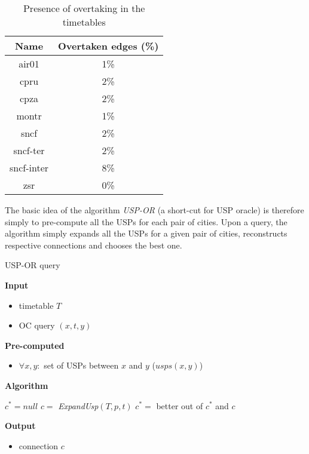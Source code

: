     \begin{table}[h!]
    	\centering
		\begin{tabular}{c|c}
            \rowcolor{tablehead}
        	\textbf{Name} & \textbf{Overtaken edges (\%)} \\
			\hline
			air01 & 1\% \\
			cpru & 2\% \\
			cpza & 2\% \\
			montr & 1\% \\
			sncf & 2\% \\
			sncf-ter & 2\% \\
			sncf-inter & 8\% \\
			zsr & 0\% \\
		\end{tabular}
		\caption{\label{tab:overtake} Presence of overtaking in the timetables}
	\end{table}
	
	\noindent The basic idea of the algorithm \textit{USP-OR} (a short-cut for USP oracle) is therefore simply to pre-compute all the USPs for each pair of cities. Upon a query, the algorithm simply expands all the USPs for a given pair of cities, reconstructs respective connections and chooses the best one. \\
	
	\color{algcolor}
	\begin{algorithm}[H]
		\color{inalgcolor}
		\caption{USP-OR query}
		\label{alg:uspor-query}
		\textbf{Input} 
		\begin{itemize}
			\item timetable $T$
			\item OC query $(x, t, y)$
		\end{itemize}
		\textbf{Pre-computed} 
		\begin{itemize}
			\item $\forall x, y:$ set of USPs between $x$ and $y$ ($usps(x, y)$)
		\end{itemize}
		\textbf{Algorithm}
		\begin{algorithmic}
			\STATE $c^{*} = null$
				\STATE $c =$ \textit{ExpandUsp}$(T, p, t)$
				\STATE $c^{*} =$ better out of $c^{*}$ and $c$
			\ENDFOR
		\end{algorithmic}
		\textbf{Output}
		\begin{itemize}
			\item connection $c$
		\end{itemize}
	\end{algorithm}
	\color{black}
	
